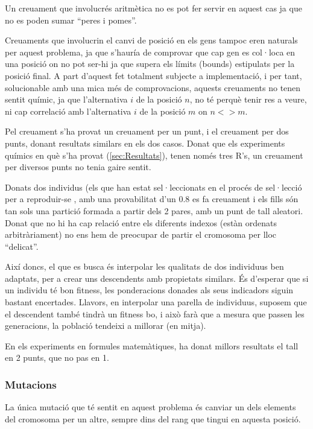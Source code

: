 Un creuament que involucrés aritmètica no es pot fer servir en aquest cas ja que
no es poden sumar ``peres i pomes''.

Creuaments que involucrin el canvi de posició en els gens tampoc eren naturals
per aquest problema, ja que s'hauría de comprovar que cap gen es col·loca en una
posició on no pot ser-hi ja que supera els límits (bounds) estipulats per la
posició final.  A part d'aquest fet totalment subjecte a implementació, i per
tant, solucionable amb una mica més de comprovacions, aquests creuaments no
tenen sentit químic, ja que l'alternativa $i$ de la posició $n$, no té perquè
tenir res a veure, ni cap correlació amb l'alternativa $i$ de la posició $m$ on
$n <> m$.

Pel creuament s'ha provat un creuament per un punt, i el creuament per dos
punts, donant resultats similars en els dos casos.  Donat que els experiments
químics en què s'ha provat (\ref{sec:Resultats}), tenen només tres R's, un
creuament per diversos punts no tenia gaire sentit.

Donats dos individus (els que han estat sel·leccionats en el procés de
sel·lecció per a reproduir-se , amb una provabilitat d'un 0.8 es fa creuament i
els fills són tan sols una partició formada a partir dels 2 pares, amb un punt
de tall aleatori.  Donat que no hi ha cap relació entre els diferents indexos
(estàn ordenats arbitràriament) no ens hem de preocupar de partir el cromosoma
per lloc ``delicat''. 

Així doncs, el que es busca és interpolar les qualitats de dos individuus ben
adaptats, per a crear uns descendents amb propietats similars.  És d'esperar que
si un individu té bon fitness, les ponderacions donades als seus indicadors
siguin bastant encertades.  Llavors, en interpolar una parella de individuus,
suposem que el descendent també tindrà un fitness bo, i això farà que a mesura
que passen les generacions, la població tendeixi a millorar (en mitja).

En els experiments en formules matemàtiques, ha donat millors resultats el tall
en 2 punts, que no pas en 1.


\subsubsection{Mutacions} %
\label{ssub:Mutacions}

La única mutació que té sentit en aquest problema és canviar un dels elements
del cromosoma per un altre, sempre dins del rang que tingui en aquesta posició.

